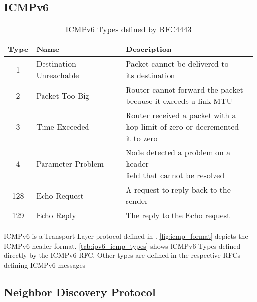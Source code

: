 \subsection{ICMPv6}
\label{sec:icmp_v6}



\begin{table}
	\centering
	\caption{ICMPv6 Types defined by RFC4443}
	\begin{tabular}{|c|l|l|} \hline
	Type & Name                    & Description \\ \hline \hline
	1    & Destination Unreachable & \makecell[l]{Packet cannot be delivered to \\ its destination}                                  \\ \hline
	2    & Packet Too Big          & \makecell[l]{Router cannot forward the packet \\ because it exceeds a link-MTU}                 \\ \hline
	3    & Time Exceeded           & \makecell[l]{Router received a packet with a \\ hop-limit of zero or decremented \\ it to zero} \\ \hline
	4    & Parameter Problem       & \makecell[l]{Node detected a problem on a header \\ field that cannot be resolved}              \\ \hline
	128  & Echo Request            & A request to reply back to the sender                                                           \\ \hline
	129  & Echo Reply              & The reply to the Echo request                                                                   \\ \hline
	\end{tabular}
	\label{tab:ipv6_icmp_types}
\end{table}

ICMPv6 is a Transport-Layer protocol defined in \cite{rfc4443}.
\autoref{fig:icmp_format} depicts the ICMPv6 header format.
\autoref{tab:ipv6_icmp_types} shows ICMPv6 Types defined directly by the ICMPv6 RFC.
Other types are defined in the respective RFCs defining ICMPv6 messages.

\subsection{Neighbor Discovery Protocol}
\label{sec:ipv6_ndp}

